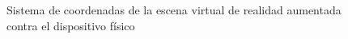\begin{figure}[H]
    \caption{Sistema de coordenadas de la escena virtual de realidad aumentada contra el dispositivo físico}
    \centering
    \label{fig:coordinate_system_scene}
\end{figure}
